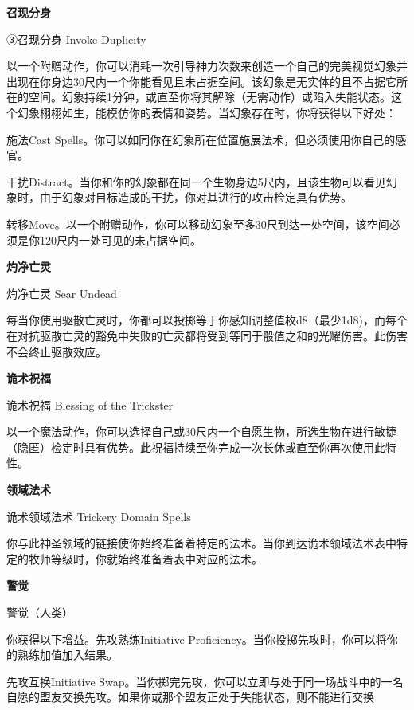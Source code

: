 \documentclass[letterpaper,openany,twoside,twocolumn]{book}
\begin{document}
\par\noindent\textbf{召现分身}\par
③召现分身 Invoke Duplicity\par
以一个附赠动作，你可以消耗一次引导神力次数来创造一个自己的完美视觉幻象并出现在你身边30尺内一个你能看见且未占据空间。该幻象是无实体的且不占据它所在的空间。幻象持续1分钟，或直至你将其解除（无需动作）或陷入失能状态。这个幻象栩栩如生，能模仿你的表情和姿势。当幻象存在时，你将获得以下好处：\par
施法Cast Spells。你可以如同你在幻象所在位置施展法术，但必须使用你自己的感官。\par
干扰Distract。当你和你的幻象都在同一个生物身边5尺内，且该生物可以看见幻象时，由于幻象对目标造成的干扰，你对其进行的攻击检定具有优势。\par
转移Move。以一个附赠动作，你可以移动幻象至多30尺到达一处空间，该空间必须是你120尺内一处可见的未占据空间。\par


\par\noindent\textbf{灼净亡灵}\par
灼净亡灵 Sear Undead\par
每当你使用驱散亡灵时，你都可以投掷等于你感知调整值枚d8（最少1d8)，而每个在对抗驱散亡灵的豁免中失败的亡灵都将受到等同于骰值之和的光耀伤害。此伤害不会终止驱散效应。\par


\par\noindent\textbf{诡术祝福}\par
诡术祝福 Blessing of the Trickster\par
以一个魔法动作，你可以选择自己或30尺内一个自愿生物，所选生物在进行敏捷（隐匿）检定时具有优势。此祝福持续至你完成一次长休或直至你再次使用此特性。\par


\par\noindent\textbf{领域法术}\par
诡术领域法术 Trickery Domain Spells\par
你与此神圣领域的链接使你始终准备着特定的法术。当你到达诡术领域法术表中特定的牧师等级时，你就始终准备着表中对应的法术。\par


\par\noindent\textbf{警觉}\par
警觉（人类）\par
你获得以下增益。先攻熟练Initiative Proficiency。当你投掷先攻时，你可以将你的熟练加值加入结果。\par
先攻互换Initiative Swap。当你掷完先攻，你可以立即与处于同一场战斗中的一名自愿的盟友交换先攻。如果你或那个盟友正处于失能状态，则不能进行交换\par
\end{document}
